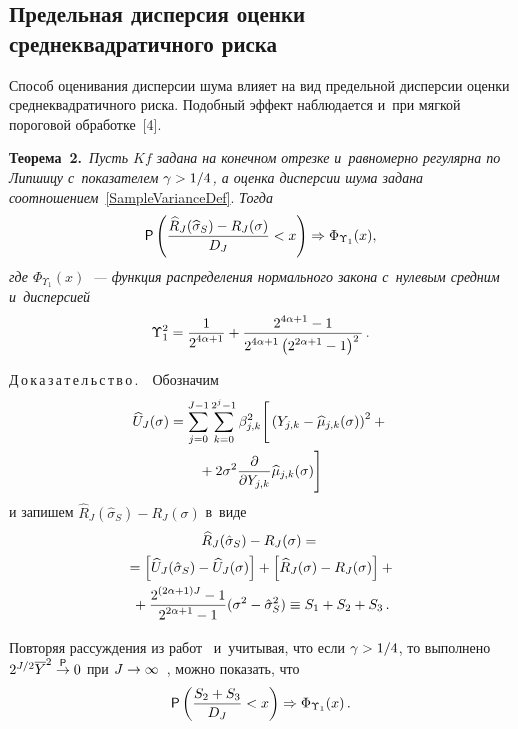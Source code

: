 \begin{multicols}{2}
\section{Предельная дисперсия оценки среднеквадратичного риска}

Способ оценивания дисперсии шума влияет на вид предельной дисперсии 
оценки среднеквадратичного риска. Подобный эффект наблюдается и~при 
мягкой пороговой обработке~[4].

\noindent
\textbf{Теорема~2.}\ \textit{Пусть $Kf$ задана на конечном отрезке и~равномерно 
регулярна по Липшицу с~показателем $\gamma\hm>1/4$, а оценка дисперсии 
шума задана соотношением}~\eqref{SampleVarianceDef}. \textit{Тогда}
\begin{equation}
\label{CLT_Operator_SampleVar_Sigma}
\mathsf{P}\left(\frac{\widehat{R}_J(\widehat{\sigma}_S)-R_J(\sigma)}{D_J}<x\right)
\Rightarrow \Phi_{\Upsilon_1}(x),\notag
\end{equation}
\textit{где $\Phi_{\Upsilon_1}(x)$~--- функция распределения нормального 
закона с~нулевым средним и~дисперсией}
$$
\Upsilon_1^2=\displaystyle\frac{\displaystyle 1\mathstrut}{\displaystyle 2^{4\alpha+1}\mathstrut}+
\displaystyle\frac{\displaystyle 2^{4\alpha+1}-1\mathstrut}{\displaystyle 2^{4\alpha+1}\left(2^{2\alpha+1}-1\right)^2\mathstrut}\,.
$$

\noindent
Д\,о\,к\,а\,з\,а\,т\,е\,л\,ь\,с\,т\,в\,о\,.\ \ Обозначим
\begin{multline*}
\widehat{U}_J(\sigma)=\sum\limits_{j=0}^{J-1}\sum\limits_{k=0}^{2^j-1}
\beta^2_{j,k}\Bigg[
\left(Y_{j,k}-\widehat{\mu}_{j,k}(\sigma)\right)^2+{}\\
{}+2\sigma^2\fr{\partial}{\partial Y_{j,k}}\widehat{\mu}_{j,k}(\sigma)\Bigg] %
\end{multline*}
и запишем $\widehat{R}_J(\hat{\sigma}_S)-R_J(\sigma)$ в~виде
\begin{multline*}
\widehat{R}_J(\hat{\sigma}_S)-R_J(\sigma)={}\\
{}=\left[\widehat{U}_J(\hat{\sigma}_S)-\widehat{U}_J(\sigma)\right]+
\left[\widehat{R}_J(\sigma)-R_J(\sigma)\right]+{}\\
{}+
\displaystyle\frac{\displaystyle 2^{(2\alpha+1)J}-1\mathstrut}{\displaystyle 2^{2\alpha+1}-1\mathstrut}(\sigma^2-\hat{\sigma}^2_S)
\equiv S_1+S_2+S_3\,.
\end{multline*}

Повторяя рассуждения из работ~\cite{KS11-1, KS11-2} и~учитывая, что если $\gamma\hm>1/4$, 
то выполнено $2^{J/2}\overline{Y}^2\stackrel{{\sf P}}{\to} 0$ при 
$J\hm\rightarrow\infty$~\cite{KS11-2}, можно показать, что
\begin{equation*}
{\sf P}\left(\fr{S_2+S_3}{D_J}<x\right)\Rightarrow\Phi_{\Upsilon_1}(x)\,.%
\end{equation*}


\end{multicols}
